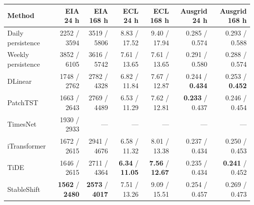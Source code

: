 {
\scriptsize
\begin{tabular}{lrrrrrr}
\toprule
Method & EIA 24 h & EIA 168 h & ECL 24 h & ECL 168 h & Ausgrid 24 h & Ausgrid 168 h \\
\midrule
Daily persistence & 2252 / 3594 & 3519 / 5806 & 8.83 / 17.52 & 9.40 / 17.94 & 0.285 / 0.574 & 0.293 / 0.588 \\
Weekly persistence & 3852 / 6105 & 3616 / 5742 & 7.61 / 13.65 & 7.61 / 13.65 & 0.291 / 0.580 & 0.288 / 0.574 \\
DLinear & 1748 / 2762 & 2782 / 4328 & 6.82 / 11.84 & 7.67 / 12.87 & 0.244 / \textbf{0.434} & 0.253 / \textbf{0.452} \\
PatchTST & 1663 / 2643 & 2769 / 4489 & 6.53 / 11.29 & 7.62 / 12.81 & \textbf{0.233} / 0.437 & 0.246 / 0.454 \\
TimesNet & 1930 / 2933 & --- & --- & --- & --- & --- \\
iTransformer & 1672 / 2615 & 2941 / 4676 & 6.58 / 11.32 & 8.01 / 13.38 & 0.237 / 0.434 & 0.250 / 0.453 \\
TiDE & 1646 / 2615 & 2711 / 4364 & \textbf{6.34} / \textbf{11.05} & \textbf{7.56} / \textbf{12.67} & 0.235 / 0.434 & \textbf{0.241} / 0.452 \\
StableShift & \textbf{1562} / \textbf{2480} & \textbf{2573} / \textbf{4017} & 7.51 / 13.26 & 9.09 / 15.51 & 0.254 / 0.457 & 0.269 / 0.473 \\
\bottomrule
\end{tabular}
}
